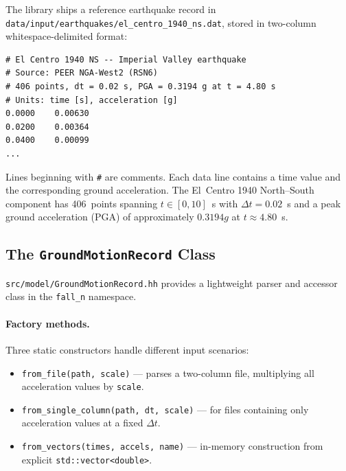 The library ships a reference earthquake record in
\texttt{data/input/earthquakes/el\_centro\_1940\_ns.dat},
stored in two-column whitespace-delimited format:
%
\begin{lstlisting}[language={},basicstyle=\ttfamily\small]
# El Centro 1940 NS -- Imperial Valley earthquake
# Source: PEER NGA-West2 (RSN6)
# 406 points, dt = 0.02 s, PGA = 0.3194 g at t = 4.80 s
# Units: time [s], acceleration [g]
0.0000    0.00630
0.0200    0.00364
0.0400    0.00099
...
\end{lstlisting}
%
Lines beginning with \texttt{\#} are comments.  Each data line
contains a time value and the corresponding ground acceleration.
The El~Centro 1940 North--South component has 406~points
spanning $t \in [0, 10]$~s with $\Delta t = 0.02$~s and a peak
ground acceleration (PGA) of approximately $0.3194g$ at
$t \approx 4.80$~s.


\subsection{The \texttt{GroundMotionRecord} Class}

\texttt{src/model/GroundMotionRecord.hh} provides a lightweight parser
and accessor class in the \texttt{fall\_n} namespace.

\paragraph{Factory methods.}
Three static constructors handle different input scenarios:
%
\begin{itemize}
  \item \texttt{from\_file(path, scale)} --- parses a two-column file,
        multiplying all acceleration values by \texttt{scale}.
  \item \texttt{from\_single\_column(path, dt, scale)} --- for files
        containing only acceleration values at a fixed $\Delta t$.
  \item \texttt{from\_vectors(times, accels, name)} --- in-memory
        construction from explicit \texttt{std::vector<double>}.
\end{itemize}

